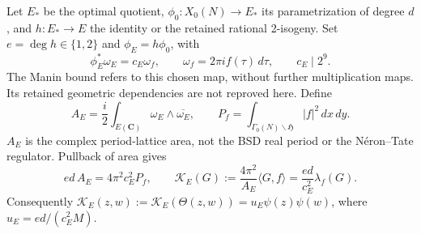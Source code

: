 \documentclass[11pt]{article}
\newcommand{\K}{\mathscr K_E}
\begin{document}
Let $E_*$ be the optimal quotient, $\phi_0:X_0(N)\to E_*$ its
parametrization of degree $d$, and $h:E_*\to E$ the identity or the
retained rational 2-isogeny. Set $e=\deg h\in\{1,2\}$ and
$\phi_E=h\phi_0$, with
\[
 \phi_E^*\omega_E=c_E\omega_f,\qquad
 \omega_f=2\pi i f(\tau)\,d\tau,\qquad c_E\mid2^9.
\]
The Manin bound refers to this chosen map, without further multiplication
maps. Its retained geometric dependencies are not reproved here.
Define
\[
 A_E=\frac i2\int_{E(\mathbf C)}\omega_E\wedge\overline{\omega_E},
 \qquad P_f=\int_{\Gamma_0(N)\backslash\mathfrak H}|f|^2\,dx\,dy.
\]
$A_E$ is the complex period-lattice area, not the BSD real period or the
N\'eron--Tate regulator. Pullback of area gives
\begin{equation}\label{area}
 ed\,A_E=4\pi^2c_E^2P_f,\qquad
 \K(G):=\frac{4\pi^2}{A_E}\langle G,f\rangle
       =\frac{ed}{c_E^2}\lambda_f(G).
\end{equation}
Consequently $\K(z,w):=\K(\Theta(z,w))=u_E\psi(z)\psi(w)$, where
$u_E=ed/(c_E^2M)$.
\end{document}
